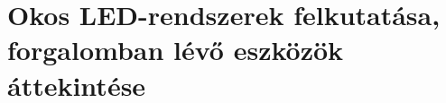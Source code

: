 \documentclass[../main.tex]{subfiles}
\begin{document}
\section{Okos LED-rendszerek felkutatása, forgalomban lévő eszközök áttekintése}
\end{document}
